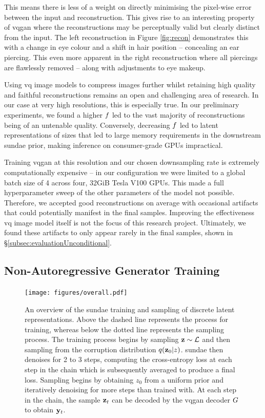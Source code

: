 This means there is less of a weight on directly minimising the pixel-wise error
between the input and reconstruction. This gives rise to an interesting property
of \gls{vqgan} where the reconstructions may be perceptually valid but clearly
distinct from the input. The left reconstruction in Figure \ref{fig:recon}
demonstrates this with a change in eye colour and a shift in hair position --
concealing an ear piercing. This even more apparent in the right reconstruction
where all piercings are flawlessly removed -- along with adjustments to eye
makeup.

Using \gls{vq} image models to compress images further whilst retaining high
quality and faithful reconstructions remains an open and challenging area of
research. In our case at very high resolutions, this is especially true. In our
preliminary experiments, we found a higher $f$ led to the vast
majority of reconstructions being of an untenable quality. Conversely, decreasing
$f$ led to latent representations of sizes that led to large
memory requirements in the downstream \gls{sundae} prior, making inference on
consumer-grade GPUs impractical.

Training \gls{vqgan} at this resolution and our chosen downsampling rate is
extremely computationally expensive -- in our configuration we were limited to a
global batch size of 4 across four, 32GiB Tesla V100 GPUs. This made a full
hyperparameter sweep of the other parameters of the model not possible.
Therefore, we accepted good reconstructions on average with occasional
artifacts that could potentially manifest in the final samples. Improving the
effectiveness \gls{vq} image model itself is not the focus of this research
project. Ultimately, we found these artifacts to only appear rarely in the final
samples, shown in \S\ref{subsec:evaluationUnconditional}.

\subsection{Non-Autoregressive Generator Training}
\label{subsec:sundaeTraining}

\begin{figure}[ht]
    \centering
    \texttt{[image: figures/overall.pdf]}
    \caption{
        An overview of the \gls{sundae} training and sampling of discrete latent
        representations. Above the dashed line represents the process for
        training, whereas below the dotted line represents the sampling process.
        The training process begins by sampling $\mathbf{z} \sim \mathcal{L}$
        and then sampling from the corruption distribution $q(\mathbf{z}_0 \vert
        z)$. \Gls{sundae} then denoises for 2 to 3 steps, computing the
        cross-entropy loss at each step in the chain which is subsequently
        averaged to produce a final loss. Sampling begins by obtaining $z_0$
        from a uniform prior and iteratively denoising for more steps than
        trained with. At each step in the chain, the sample $\mathbf{z}_t$ can be
        decoded by the \gls{vqgan} decoder $G$ to obtain $\mathbf{y}_t$.
    }
    \label{fig:overall}
\end{figure}

